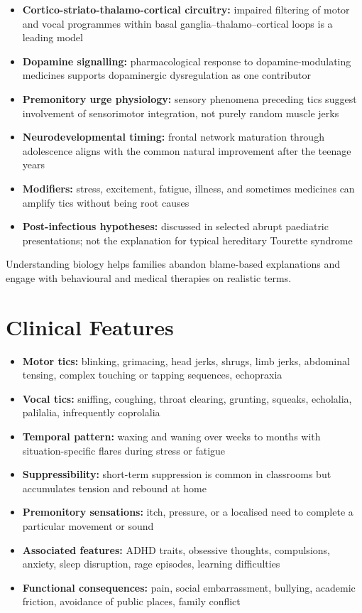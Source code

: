 \begin{itemize}
    \item \textbf{Cortico-striato-thalamo-cortical circuitry:} impaired filtering of motor and vocal programmes within basal ganglia--thalamo--cortical loops is a leading model
    \item \textbf{Dopamine signalling:} pharmacological response to dopamine-modulating medicines supports dopaminergic dysregulation as one contributor
    \item \textbf{Premonitory urge physiology:} sensory phenomena preceding tics suggest involvement of sensorimotor integration, not purely random muscle jerks
    \item \textbf{Neurodevelopmental timing:} frontal network maturation through adolescence aligns with the common natural improvement after the teenage years
    \item \textbf{Modifiers:} stress, excitement, fatigue, illness, and sometimes medicines can amplify tics without being root causes
    \item \textbf{Post-infectious hypotheses:} discussed in selected abrupt paediatric presentations; not the explanation for typical hereditary Tourette syndrome
\end{itemize}

Understanding biology helps families abandon blame-based explanations and engage with behavioural and medical therapies on realistic terms.

\section*{Clinical Features}
\begin{itemize}
    \item \textbf{Motor tics:} blinking, grimacing, head jerks, shrugs, limb jerks, abdominal tensing, complex touching or tapping sequences, echopraxia
    \item \textbf{Vocal tics:} sniffing, coughing, throat clearing, grunting, squeaks, echolalia, palilalia, infrequently coprolalia
    \item \textbf{Temporal pattern:} waxing and waning over weeks to months with situation-specific flares during stress or fatigue
    \item \textbf{Suppressibility:} short-term suppression is common in classrooms but accumulates tension and rebound at home
    \item \textbf{Premonitory sensations:} itch, pressure, or a localised need to complete a particular movement or sound
    \item \textbf{Associated features:} ADHD traits, obsessive thoughts, compulsions, anxiety, sleep disruption, rage episodes, learning difficulties
    \item \textbf{Functional consequences:} pain, social embarrassment, bullying, academic friction, avoidance of public places, family conflict
\end{itemize}

